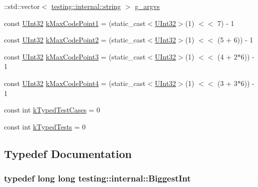 \begin{DoxyCompactItemize}
\+::std\+::vector$<$ \hyperlink{namespacetesting_1_1internal_a8e8ff5b11e64078831112677156cb111}{testing\+::internal\+::string} $>$ \hyperlink{namespacetesting_1_1internal_ab7fe90df4f87f1bd8a244b0be2ccad79}{g\+\_\+argvs}
\item 
const \hyperlink{namespacetesting_1_1internal_a40d4fffcd2bf56f18b1c380615aa85e3}{U\+Int32} \hyperlink{namespacetesting_1_1internal_a128515c8ed6c0fe98e498c8042da2060}{k\+Max\+Code\+Point1} = (static\+\_\+cast$<$\hyperlink{namespacetesting_1_1internal_a40d4fffcd2bf56f18b1c380615aa85e3}{U\+Int32}$>$(1) $<$$<$ 7) -\/ 1
\item 
const \hyperlink{namespacetesting_1_1internal_a40d4fffcd2bf56f18b1c380615aa85e3}{U\+Int32} \hyperlink{namespacetesting_1_1internal_ab8f4a5ed784352f00342cfeadc72337e}{k\+Max\+Code\+Point2} = (static\+\_\+cast$<$\hyperlink{namespacetesting_1_1internal_a40d4fffcd2bf56f18b1c380615aa85e3}{U\+Int32}$>$(1) $<$$<$ (5 + 6)) -\/ 1
\item 
const \hyperlink{namespacetesting_1_1internal_a40d4fffcd2bf56f18b1c380615aa85e3}{U\+Int32} \hyperlink{namespacetesting_1_1internal_aa42bd507418e570402996e33582beed3}{k\+Max\+Code\+Point3} = (static\+\_\+cast$<$\hyperlink{namespacetesting_1_1internal_a40d4fffcd2bf56f18b1c380615aa85e3}{U\+Int32}$>$(1) $<$$<$ (4 + 2$\ast$6)) -\/ 1
\item 
const \hyperlink{namespacetesting_1_1internal_a40d4fffcd2bf56f18b1c380615aa85e3}{U\+Int32} \hyperlink{namespacetesting_1_1internal_acd87c60be9b5fedb2d017503d8834474}{k\+Max\+Code\+Point4} = (static\+\_\+cast$<$\hyperlink{namespacetesting_1_1internal_a40d4fffcd2bf56f18b1c380615aa85e3}{U\+Int32}$>$(1) $<$$<$ (3 + 3$\ast$6)) -\/ 1
\item 
const int \hyperlink{namespacetesting_1_1internal_a685ea5332074ae63b0ded2b184ac2271}{k\+Typed\+Test\+Cases} = 0
\item 
const int \hyperlink{namespacetesting_1_1internal_a53ee2d113744f9ba1d89469db4d7388b}{k\+Typed\+Tests} = 0
\end{DoxyCompactItemize}


\subsection{Typedef Documentation}
\subsubsection[{\texorpdfstring{Biggest\+Int}{BiggestInt}}]{\setlength{\rightskip}{0pt plus 5cm}typedef long long {\bf testing\+::internal\+::\+Biggest\+Int}}\hypertarget{namespacetesting_1_1internal_a05c6bd9ede5ccdf25191a590d610dcc6}{}\label{namespacetesting_1_1internal_a05c6bd9ede5ccdf25191a590d610dcc6}
